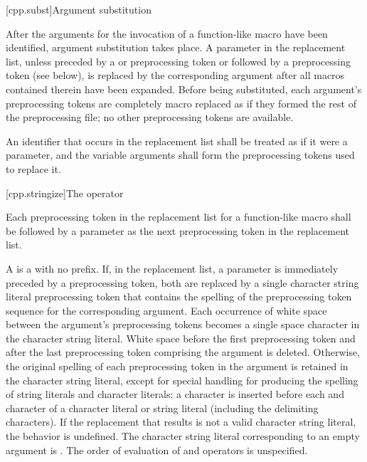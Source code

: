 [cpp.subst]{Argument substitution}%
%
%

\pnum
After the arguments for the invocation of a function-like macro have
been identified, argument substitution takes place.
A parameter in the replacement list, unless preceded by a
\tcode{\#}
or
\tcode{\#\#}
preprocessing token or followed by a
\tcode{\#\#}
preprocessing token (see below),
is replaced by the corresponding argument after all macros
contained therein have been expanded.
Before being substituted,
each argument's preprocessing tokens are completely
macro replaced as if they formed the rest of the
preprocessing file;
no other preprocessing tokens are available.

\pnum
An identifier  that occurs in the replacement list
shall be treated as if it were a parameter, and the variable arguments shall form
the preprocessing tokens used to replace it.

[cpp.stringize]{The \tcode{\#} operator}%
%

\pnum
Each
\tcode{\#}
preprocessing token in the replacement list for a function-like
macro shall be followed by a parameter as the next preprocessing
token in the replacement list.

\pnum
A  is a  with no prefix.
If, in the replacement list, a parameter is immediately
preceded by a
\tcode{\#}
preprocessing token,
both are replaced by a single character string literal preprocessing token that
contains the spelling of the preprocessing token sequence for the
corresponding argument.
Each occurrence of white space between the argument's preprocessing
tokens becomes a single space character in the character string literal.
White space before the first preprocessing token and after the last
preprocessing token comprising the argument is deleted.
Otherwise, the original spelling of each preprocessing token in the
argument is retained in the character string literal,
except for special handling for producing the spelling of
string literals and character literals:
a
\tcode{\textbackslash}
character is inserted before each
and
\tcode{\textbackslash}
character of a character literal or string literal
(including the delimiting
characters).
If the replacement that results is not a valid character string literal,
the behavior is undefined. The character string literal corresponding to
an empty argument is .
The order of evaluation of
\tcode{\#}
and
\tcode{\#\#}
operators is unspecified.

